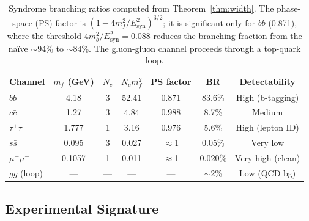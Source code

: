 \documentclass[11pt,a4paper]{article}
\theoremstyle{definition}
\theoremstyle{remark}
\newcommand{\Esyn}{E_{\mathrm{syn}}}
\begin{document}
\begin{table}[H]
\centering
\begin{tabular}{lcccccc}
\toprule
\textbf{Channel} & \textbf{$m_f$ (GeV)} & \textbf{$N_c$} & \textbf{$N_c m_f^2$} & \textbf{PS factor} & \textbf{BR} & \textbf{Detectability} \\
\midrule
$b\bar{b}$ & 4.18 & 3 & 52.41 & 0.871 & 83.6\% & High (b-tagging) \\
$c\bar{c}$ & 1.27 & 3 & 4.84 & 0.988 & 8.7\% & Medium \\
$\tau^+\tau^-$ & 1.777 & 1 & 3.16 & 0.976 & 5.6\% & High (lepton ID) \\
$s\bar{s}$ & 0.095 & 3 & 0.027 & $\approx$1 & 0.05\% & Very low \\
$\mu^+\mu^-$ & 0.1057 & 1 & 0.011 & $\approx$1 & 0.020\% & Very high (clean) \\
$gg$ (loop) & --- & --- & --- & --- & $\sim$2\% & Low (QCD bg) \\
\bottomrule
\end{tabular}
\caption{Syndrome branching ratios computed from Theorem~\ref{thm:width}. The phase-space (PS) factor is $(1 - 4m_f^2/\Esyn^2)^{3/2}$; it is significant only for $b\bar{b}$ (0.871), where the threshold $4m_b^2/\Esyn^2 = 0.088$ reduces the branching fraction from the na\"{i}ve $\sim$94\% to $\sim$84\%. The gluon-gluon channel proceeds through a top-quark loop.}
\label{tab:BR}
\end{table}

\subsection{Experimental Signature}
\end{document}
